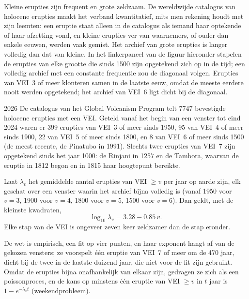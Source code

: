 Kleine erupties zijn frequent en grote zeldzaam. De wereldwijde catalogus van
holocene erupties maakt het verband kwantitatief, mits men rekening houdt met zijn
leemten: een eruptie staat alleen in de catalogus als iemand haar optekende of haar
afzetting vond, en kleine erupties ver van waarnemers, of ouder dan enkele eeuwen,
werden vaak gemist. Het archief van grote erupties is langer volledig dan
dat van kleine. In het linkerpaneel van de figuur hieronder stapelen de erupties van elke
grootte die sinds 1500 zijn opgetekend zich op in de tijd; een volledig archief met een constante
frequentie zou de diagonaal volgen. Erupties van VEI~3 of meer klonteren samen in de laatste
eeuw, omdat de meeste eerdere nooit werden opgetekend; het archief van VEI~6
ligt dicht bij de diagonaal.

\begin{dated}{2026}
De catalogus van het Global Volcanism Program telt \num{7747} bevestigde holocene
erupties met een VEI. Geteld vanaf het begin van een venster tot eind 2024
waren er 399 erupties van VEI~3 of meer sinds 1950, 95 van VEI~4 of meer sinds 1900,
22 van VEI~5 of meer sinds 1800, en 8 van VEI~6 of meer sinds 1500 (de meest
recente, de Pinatubo in 1991). Slechts twee erupties van VEI~7 zijn opgetekend sinds het jaar
1000: de Rinjani in 1257 en de Tambora, waarvan de eruptie in 1812 begon en in
1815 haar hoogtepunt bereikte.
\end{dated}

\begin{proposition}\label{prop:b2:eruptive-styles:frequency}
Laat $\lambda_v$ het gemiddelde aantal erupties van VEI $\ge v$ per jaar op aarde zijn,
elk geschat over een venster waarin het archief bijna volledig is (vanaf 1950
voor $v = 3$, 1900 voor $v = 4$, 1800 voor $v = 5$, 1500 voor $v = 6$). Dan geldt, met de kleinste
kwadraten,
\[
\log_{10}\lambda_v = 3.28 - 0.85\,v .
\]
Elke stap van de VEI is ongeveer zeven keer zeldzamer dan de stap eronder.
\end{proposition}

De wet is empirisch, een fit op vier punten, en haar exponent hangt af van de
gekozen vensters; ze voorspelt één eruptie van VEI~7 of meer om de \num{470} jaar,
dicht bij de twee in de laatste duizend jaar, die niet voor de fit zijn gebruikt. Omdat
de erupties bijna onafhankelijk van elkaar zijn, gedragen ze zich als een
poissonproces, en de kans op minstens één eruptie van VEI $\ge v$ in $t$ jaar
is $1 - e^{-\lambda_vt}$ (weekendprobleem).

